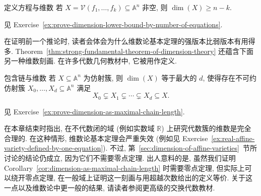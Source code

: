 \begin{Corollary}{定义方程与维数}\leavevmode\label{cor:dimension-lower-bound-by-number-of-equations}
若 $X=\mathcal{V}(f_{1},\ldots,f_{k})\subseteq\mathbb{A}^{n}$ 非空, 则 $\dim(X)\geq n-k$.
\end{Corollary}
\begin{Proof}
见 Exercise~\ref{ex:prove-dimension-lower-bound-by-number-of-equations}.
\end{Proof}

在证明前一个推论时, 读者会体会为什么维数论基本定理的强版本比弱版本有用得多. Theorem~\ref{thm:strong-fundamental-theorem-of-dimension-theory} 还蕴含下面另一种维数刻画. 在许多代数几何教材中, 它被用作定义.

\begin{Corollary}{包含链与维数}\leavevmode\label{cor:dimension-as-maximal-chain-length}
若 $X\subseteq\mathbb{A}^{n}$ 为仿射簇, 则 $\dim(X)$ 等于最大的 $d$, 使得存在不可约仿射簇 $X_{0},\ldots,X_{d}\subseteq\mathbb{A}^{n}$ 满足
\[
  X_{0}\subsetneq X_{1}\subsetneq\cdots\subsetneq X_{d}\subseteq X.
\]
\end{Corollary}
\begin{Proof}
见 Exercise~\ref{ex:prove-dimension-as-maximal-chain-length}.
\end{Proof}

在本章结束时指出, 在不代数闭的域 (例如实数域 $\mathbb{R}$) 上研究代数簇的维数是完全合理的. 在这种情形, 维数论基本定理会严重失效 (例如见 Exercise~\ref{ex:real-affine-variety-defined-by-one-equation}). 不过, 第~\ref{sec:dimension-of-affine-varieties}~节所讨论的结论仍成立, 因为它们不需要零点定理. 出人意料的是, 虽然我们证明 Corollary~\ref{cor:dimension-as-maximal-chain-length} 时需要零点定理, 但实际上可以绕开零点定理, 在一般域上证明这一刻画与用超越次数给出的定义等价. 关于这一点以及维数论中更一般的结果, 请读者参阅更高级的交换代数教材.

